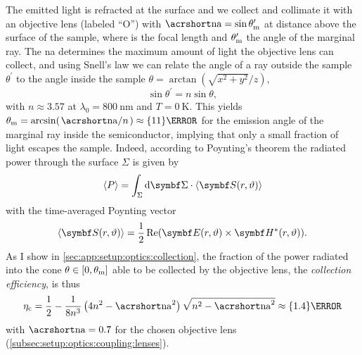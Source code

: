 The emitted light is refracted at the surface and we collect and collimate it with an objective lens (labeled \enquote{O}) with $\NA=\sin\theta^\prime_\mr{m}$ at distance \fob above the surface of the sample, where \fob is the focal length and $\theta^\prime_{\mathrm{m}}$ the angle of the marginal ray.
The \gls{na} determines the maximum amount of light the objective lens can collect, and using Snell's law we can relate the angle of a ray outside the sample $\theta^\prime$ to the angle inside the sample $\theta = \arctan(\sqrt{x^2 + y^2}/z)$,
\begin{equation}\label{eq:setup:optics:coupling:snell}
    \sin\theta^\prime = n\sin\theta,
\end{equation}
with $n\approx 3.57$ at $\lambda_0=\qty{800}{\nano\meter}$ and $T=\qty{0}{\kelvin}$.
This yields $\theta_{\mr{m}} = \arcsin(\flatfrac{\NA}{n}) \approx\qty{11}{\degree}$ for the emission angle of the marginal ray inside the semiconductor, implying that only a small fraction of light escapes the sample.
Indeed, according to Poynting's theorem the radiated power through the surface $\Sigma$ is given by
\begin{equation}\label{eq:setup:optics:coupling:power}
    \expval{P} = \int_{\Sigma}\dd{\bvec{\Sigma}}\cdot\expval{\bvec{S}(r, \vartheta)}
\end{equation}
with the time-averaged Poynting vector
\begin{equation}\label{eq:setup:optics:coupling:poynting}
    \expval{\bvec{S}(r, \vartheta)} = \frac{1}{2}\re(\bvec{E}(r, \vartheta)\times\bvec{H}^{\ast}(r, \vartheta)).
\end{equation}
As I show in \cref{sec:app:setup:optics:collection}, the fraction of the power radiated into the cone $\theta\in[0, \theta_{\mathrm{m}}]$ able to be collected by the objective lens, the \emph{collection efficiency}, is thus
\begin{equation}\label{eq:setup:optics:coupling:efficiency:collection}
    \eta_{\mr{c}} = \frac{1}{2} - \frac{1}{8 n^3}\left(4n^2 - \NA^2\right)\sqrt{n^2 - \NA^2} \approx \qty{1.4}{\percent}
\end{equation}
with $\NA=\num{0.7}$ for the chosen objective lens (\cf \cref{subsec:setup:optics:coupling:lenses}).

